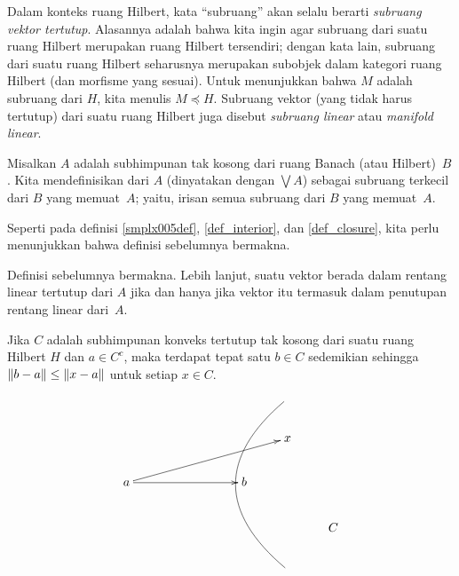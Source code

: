 \begin{conv}  Dalam konteks ruang Hilbert, kata ``subruang'' akan selalu berarti
\emph{subruang vektor tertutup}.  Alasannya adalah bahwa kita ingin agar subruang dari suatu ruang Hilbert merupakan ruang Hilbert tersendiri; dengan kata lain,
subruang dari suatu ruang Hilbert seharusnya merupakan subobjek dalam kategori ruang Hilbert (dan morfisme yang sesuai).  Untuk menunjukkan bahwa $M$ adalah subruang dari $H$, kita menulis
$M \preccurlyeq H$.  Subruang vektor (yang tidak harus tertutup) dari suatu ruang Hilbert juga
disebut \emph{subruang linear} atau \emph{manifold linear}.
\end{conv}

\begin{defn} Misalkan $A$ adalah subhimpunan tak kosong dari ruang Banach (atau Hilbert)~$B$.  Kita mendefinisikan
 dari $A$ (dinyatakan dengan $\bigvee A$) sebagai subruang terkecil dari $B$ yang memuat~$A$; yaitu,
irisan semua subruang dari $B$ yang memuat~$A$.
\end{defn}

Seperti pada definisi \ref{smplx005def}, \ref{def_interior}, dan \ref{def_closure}, kita perlu menunjukkan bahwa definisi sebelumnya bermakna.

\begin{prop} Definisi sebelumnya bermakna.  Lebih lanjut, suatu vektor berada dalam rentang linear tertutup dari $A$ jika dan hanya jika vektor itu termasuk
dalam penutupan rentang linear dari~$A$.
\end{prop}

\begin{thm} Jika $C$ adalah subhimpunan konveks tertutup tak kosong dari suatu
ruang Hilbert $H$ dan $a \in C^c$, maka terdapat tepat satu $b \in C$ sedemikian sehingga
$\lVert b - a\rVert \le \lVert x - a\rVert$ untuk setiap $x \in C$.
 \[\xymatrix{
     &&&&&{}  \\
     &&&& x   \\
     a\ar[rrrru]\ar[rrr] &&& b  \\
     &&&&&C   \\
     &&&&{}\ar@{-}@/^3.5pc/[uuuu]       }\]
\end{thm}

